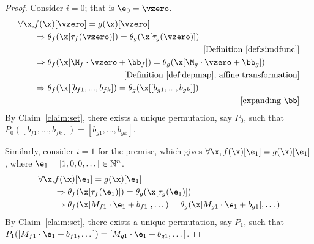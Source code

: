 \begin{proof}
    Consider $i=0$; that is $\e_0 = \vzero$.
    \begin{align*}
        \forall \x, &f(\x)[\vzero] = g(\x)[\vzero] \\
            &\Rightarrow \theta_f(\x[\tau_f(\vzero)]) = \theta_g(\x[\tau_g(\vzero)]) \\
            & \makebox[0.9\linewidth][r]{\text{[Definition~\ref{def:simdfunc}]}}\\
            &\Rightarrow \theta_f(\x[\M_f\cdot\vzero+\bb_f]) = \theta_g(\x[\M_g\cdot\vzero+\bb_g])\\
            & \makebox[0.9\linewidth][r]{\text{[Definition~\ref{def:depmap}, affine transformation]}} \\
            &\Rightarrow \theta_f(\x[[b_{f1},\text{...}, b_{fk}]) = \theta_g(\x[[b_{g1},\text{...},b_{gk}]]) \\
            &  \makebox[0.9\linewidth][r]{\text{[expanding $\bb$]}} \\
    \end{align*}
    By Claim~\ref{claim:set},
    there exists a unique permutation, say $P_0$, such that
    $P_0([b_{f1},\dots,b_{fk}]) = [b_{g1},\dots,b_{gk}]$.

    Similarly, consider $i=1$ for the premise,
    which gives $\forall \x, f(\x)[\e_1] = g(\x)[\e_1]$,
    where $\e_1=[1,0,0,\dots] \in \mathbb{N}^n$.
    \begin{align*}
        \forall \x, & f(\x)[\e_1] = g(\x)[\e_1] \\
        &\Rightarrow \theta_f(\x[\tau_f(\e_1)]) = \theta_g(\x[\tau_g(\e_1)]) \\
        &\Rightarrow \theta_f(\x[M_{f1}\cdot \e_1 + b_{f1}], \dots) = \theta_g(\x[M_{g1}\cdot \e_1 + b_{g1}], \dots)
    \end{align*}
    By Claim~\ref{claim:set},
    there exists a unique permutation, say $P_1$, such that
    $P_1([M_{f1}\cdot \e_1 + b_{f1},\dots]) = [M_{g1}\cdot \e_1 + b_{g1}, \dots]$.


\end{proof}
